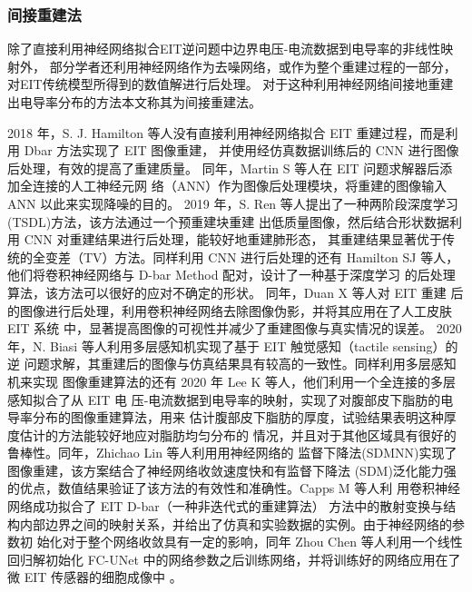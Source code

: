 \subsubsection{间接重建法}
除了直接利用神经网络拟合EIT逆问题中边界电压-电流数据到电导率的非线性映射外，
部分学者还利用神经网络作为去噪网络，或作为整个重建过程的一部分，对EIT传统模型所得到的数值解进行后处理。
对于这种利用神经网络间接地重建出电导率分布的方法本文称其为间接重建法。 

2018 年，S. J. Hamilton 等人没有直接利用神经网络拟合 EIT 重建过程，而是利用 Dbar 方法实现了 EIT 图像重建，
并使用经仿真数据训练后的 CNN 进行图像后处理，有效的提高了重建质量\cite{8352045}。
同年，Martin S 等人在 EIT 问题求解器后添加全连接的人工神经元网
络（ANN）作为图像后处理模块，将重建的图像输入 ANN 以此来实现降噪的目的\cite{S2017A}。
2019 年，S. Ren 等人提出了一种两阶段深度学习(TSDL)方法，该方法通过一个预重建块重建
出低质量图像，然后结合形状数据利用 CNN 对重建结果进行后处理，能较好地重建肺形态，
其重建结果显著优于传统的全变差（TV）方法\cite{8907811}。同样利用 CNN 进行后处理的还有
Hamilton SJ 等人，他们将卷积神经网络与 D-bar Method 配对，设计了一种基于深度学习
的后处理算法，该方法可以很好的应对不确定的形状\cite{2019Beltrami}。 同年，Duan X 等人对 EIT 重建
后的图像进行后处理，利用卷积神经网络去除图像伪影，并将其应用在了人工皮肤 EIT 系统
中，显著提高图像的可视性并减少了重建图像与真实情况的误差\cite{2019Artificial}。
2020 年，N. Biasi 等人利用多层感知机实现了基于 EIT 触觉感知（tactile sensing）的逆
问题求解，其重建后的图像与仿真结果具有较高的一致性\cite{9278823}。同样利用多层感知机来实现
图像重建算法的还有 2020 年 Lee K 等人，他们利用一个全连接的多层感知拟合了从 EIT 电
压-电流数据到电导率的映射，实现了对腹部皮下脂肪的电导率分布的图像重建算法，用来
估计腹部皮下脂肪的厚度，试验结果表明这种厚度估计的方法能较好地应对脂肪均匀分布的
情况，并且对于其他区域具有很好的鲁棒性\cite{2020Electrical}。同年，Zhichao Lin 等人利用用神经网络的
监督下降法(SDMNN)实现了图像重建，该方案结合了神经网络收敛速度快和有监督下降法
(SDM)泛化能力强的优点，数值结果验证了该方法的有效性和准确性\cite{9060508}。Capps M 等人利
用卷积神经网络成功拟合了 EIT D-bar（一种非迭代式的重建算法） 方法中的散射变换与结
构内部边界之间的映射关系，并给出了仿真和实验数据的实例\cite{9130138}。由于神经网络的参数初
始化对于整个网络收敛具有一定的影响，同年 Zhou Chen 等人利用一个线性回归解初始化
FC-UNet 中的网络参数之后训练网络，并将训练好的网络应用在了微 EIT 传感器的细胞成像中 \cite{9128764}。

